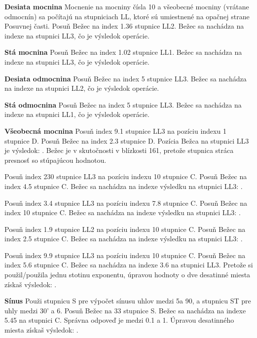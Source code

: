 \begin{multicols*}{3}
{  \textbf{Desiata mocnina}
\footnotesize Mocnenie na mocniny čísla 10 a všeobecné mocniny (vrátane odmocnín) sa počítajú na stupniciach LL, ktoré sú umiestnené na opačnej strane Posuvnej časti. \normalsize
Posuň Bežec na index 1.36 stupnice LL2.
Bežec sa nachádza na indexe  na stupnici LL3, čo je výsledok operácie.

  \textbf{Stá mocnina}
Posuň Bežec na index 1.02 stupnice LL1.
Bežec sa nachádza na indexe  na stupnici LL3, čo je výsledok operácie.

  \textbf{Desiata odmocnina}
Posuň Bežec na index 5 stupnice LL3.
Bežec sa nachádza na indexe  na stupnici LL2, čo je výsledok operácie.

  \textbf{Stá odmocnina}
Posuň Bežec na index 5 stupnice LL3.
Bežec sa nachádza na indexe  na stupnici LL1, čo je výsledok operácie.

  \textbf{Všeobecná mocnina}
Posuň index 9.1 stupnice LL3 na pozíciu indexu 1 stupnice D.
Posuň Bežec na index 2.3 stupnice D.
Pozícia Bežca na stupnici LL3 je výsledok: . Bežec je v skutočnosti v blízkosti 161, pretože stupnica stráca presnosť so stúpajúcou hodnotou. 

Posuň index 230 stupnice LL3 na pozíciu indexu 10 stupnice C.
Posuň Bežec na index 4.5 stupnice C.
Bežec sa nachádza na indexe výsledku na stupnici LL3: .

Posuň index 3.4 stupnice LL3 na pozíciu indexu 7.8 stupnice C.
Posuň Bežec na index 10 stupnice C.
Bežec sa nachádza na indexe výsledku na stupnici LL3: .

Posuň index 1.9 stupnice LL2 na pozíciu indexu 10 stupnice C.
Posuň Bežec na index 2.5 stupnice C.
Bežec sa nachádza na indexe výsledku na stupnici LL3: .

Posuň index 9.9 stupnice LL3 na pozíciu indexu 10 stupnice C.
Posuň Bežec na index 5.6 stupnice C.
Bežec sa nachádza na indexe 3.6 na stupnici LL3.
Pretože si použil/použila jednu stotinu exponentu, úpravou hodnoty o dve desatinné miesta získaš výsledok: .

  \textbf{Sínus}
\footnotesize Použi stupnicu S pre výpočet sínusu uhlov medzi 5\textdegree a 90\textdegree, a stupnicu ST pre uhly medzi 30' a 6\textdegree. \normalsize
{}
Posuň Bežec na 33 stupnice S.
Bežec sa nachádza na indexe 5.45 na stupnici C.
Správna odpoveď je medzi 0.1 a 1. Úpravou desatinného miesta získaš výsledok: .

}
\end{multicols*}
